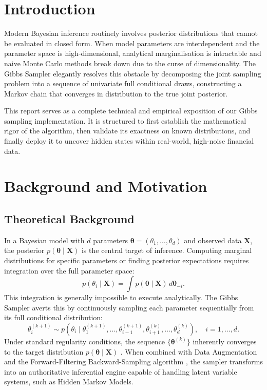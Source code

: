 \documentclass[12pt, a4paper]{article}
\begin{document}
\section{Introduction}

Modern Bayesian inference routinely involves posterior distributions that cannot be evaluated in closed form. When model parameters are interdependent and the parameter space is high-dimensional, analytical marginalisation is intractable and naive Monte Carlo methods break down due to the curse of dimensionality. The Gibbs Sampler \citep{geman1984} elegantly resolves this obstacle by decomposing the joint sampling problem into a sequence of univariate full conditional draws, constructing a Markov chain that converges in distribution to the true joint posterior.

This report serves as a complete technical and empirical exposition of our Gibbs sampling implementation. It is structured to first establish the mathematical rigor of the algorithm, then validate its exactness on known distributions, and finally deploy it to uncover hidden states within real-world, high-noise financial data.

\section{Background and Motivation}

\subsection{Theoretical Background}
In a Bayesian model with $d$ parameters $\boldsymbol{\theta} = (\theta_1, \dots, \theta_d)$ and observed data $\mathbf{X}$, the posterior $p(\boldsymbol{\theta} \mid \mathbf{X})$ is the central target of inference. Computing marginal distributions for specific parameters or finding posterior expectations requires integration over the full parameter space:
\[
  p(\theta_i \mid \mathbf{X}) = \int p(\boldsymbol{\theta} \mid \mathbf{X})\, d\boldsymbol{\theta}_{-i}.
\]
This integration is generally impossible to execute analytically. The Gibbs Sampler averts this by continuously sampling each parameter sequentially from its full conditional distribution:
\begin{equation}\label{eq:gibbs}
  \theta_i^{(k+1)} \sim p\!\left(\theta_i \mid \theta_1^{(k+1)}, \dots, \theta_{i-1}^{(k+1)}, \theta_{i+1}^{(k)}, \dots, \theta_d^{(k)}\right), \quad i = 1, \dots, d.
\end{equation}
Under standard regularity conditions, the sequence $\{\boldsymbol{\theta}^{(k)}\}$ inherently converges to the target distribution $p(\boldsymbol{\theta} \mid \mathbf{X})$ \citep{gelfand1990}. When combined with Data Augmentation \citep{tanner1987} and the Forward-Filtering Backward-Sampling algorithm \citep{chib1996}, the sampler transforms into an authoritative inferential engine capable of handling latent variable systems, such as Hidden Markov Models.
\end{document}
